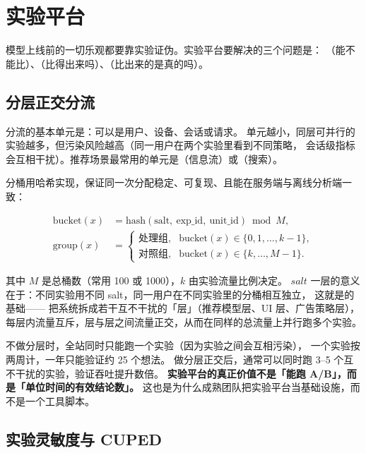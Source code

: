 \section{实验平台}

模型上线前的一切乐观都要靠实验证伪。实验平台要解决的三个问题是：
（能不能比）、（比得出来吗）、（比出来的是真的吗）。

\subsection{分层正交分流}

分流的基本单元是：可以是用户、设备、会话或请求。
单元越小，同层可并行的实验越多，但污染风险越高（同一用户在两个实验里看到不同策略，
会话级指标会互相干扰）。推荐场景最常用的单元是（信息流）或（搜索）。

分桶用哈希实现，保证同一次分配稳定、可复现、且能在服务端与离线分析端一致：

\begin{align}
\text{bucket}(x) &= \mathrm{hash}(\text{salt},\ \text{exp\_id},\ \text{unit\_id}) \bmod M,
\label{eq:bucket-hash} \\
\text{group}(x) &=
\begin{cases}
\text{处理组}, & \text{bucket}(x) \in \{0, 1, \dots, k-1\}, \\
\text{对照组}, & \text{bucket}(x) \in \{k, \dots, M-1\}.
\end{cases}
\end{align}

其中 $M$ 是总桶数（常用 100 或 1000），$k$ 由实验流量比例决定。
$salt$ 一层的意义在于：不同实验用不同 salt，同一用户在不同实验里的分桶相互独立，
这就是的基础——
把系统拆成若干互不干扰的「层」（推荐模型层、UI 层、广告策略层），
每层内流量互斥，层与层之间流量正交，从而在同样的总流量上并行跑多个实验。

\begin{insight}
不做分层时，全站同时只能跑一个实验（因为实验之间会互相污染），
一个实验按两周计，一年只能验证约 25 个想法。
做分层正交后，通常可以同时跑 3--5 个互不干扰的实验，验证吞吐提升数倍。
\textbf{实验平台的真正价值不是「能跑 A/B」，而是「单位时间的有效结论数」。}
这也是为什么成熟团队把实验平台当基础设施，而不是一个工具脚本。
\end{insight}

\subsection{实验灵敏度与 CUPED}

